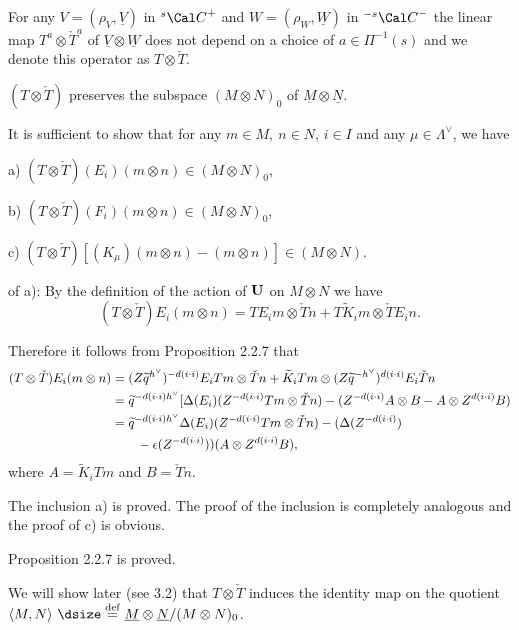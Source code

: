   For any  $V = (\rho_V, \underline{V})$ in ${}^s{\Cal C}^+$
and $W = (\rho_W, \underline{W})$  in  ${}^{-s}{\Cal C}^-$  the linear map
$T^a \otimes \check{T}^a$  of  $\underline{V} \otimes \underline{W}$  does not
depend on a choice of  $a \in \Pi^{-1}(s)$  and we denote this operator as
$T \otimes \check{T}$.


 $(T \otimes \check{T})$  preserves the subspace
$(M \otimes N)_0$ of $\underline{M} \otimes \underline{N}$.
\endproclaim

  It is sufficient to show that for any  $m \in M,\ n \in N$,
$i \in I$  and any  $\mu \in \Lambda^\vee$,  we have

\item{a)}  $(T \otimes \check{T})(E_i) (m \otimes n) \in (M \otimes N)_0$,

\item{b)}  $(T \otimes \check{T})(F_i)(m \otimes n) \in (M \otimes N)_0$,

\item{c)}  $(T \otimes \check{T})[(K_\mu)(m \otimes n) - (m \otimes n)] \in
(M \otimes N)$.
\enddemo

 of a):  By the definition of the action of ${\bold U}$  on
$M \otimes N$  we have
$$
(T \otimes \check{T}) E_i(m \otimes n) = TE_im \otimes \check{T}n +
T\widetilde{K}_im \otimes \check{T} E_in.
$$
\enddemo

Therefore it follows from Proposition 2.2.7 that
$$
\aligned
(T \otimes \check{T}) E_i (m \otimes n)
&= (Z\widetilde{q}^{h^\vee})^{-d(i\cdot i)} E_i Tm \otimes \check{T}n
+ \widetilde{K}_i Tm \otimes (Z\widetilde{q}^{-h^\vee})^{d(i\cdot i)}
E_i \check{T}n  \\
&= \widetilde{q}^{-d(i\cdot i)h^\vee} [\Delta (E_i)(Z^{-d(i\cdot i)} Tm \otimes
\check{T}n) - (Z^{-d(i\cdot i)} A \otimes B - A \otimes Z^{d(i\cdot i)}B) \\
&= \widetilde{q}^{-d(i\cdot i)h^\vee} \Delta (E_i)(Z^{-d(i\cdot i)} Tm \otimes
\check{T}n) - (\Delta(Z^{-d(i\cdot i)}) \\
&\qquad  - \epsilon(Z^{-d(i\cdot i)})) (A \otimes Z^{d(i\cdot i)}B),
\endaligned
$$
where  $A = \widetilde{K}_iTm$  and  $B = \check{T}n$.

The inclusion a) is proved.  The proof of the inclusion is completely analogous
and the proof of c) is obvious.

Proposition 2.2.7 is proved.

   We will show later (see 3.2) that $T \otimes \check{T}$
induces
the identity map on the quotient  $\langle M,N\rangle\
{\dsize\buildrel{\text{def}}\over =}\ \underline{M}\otimes
\underline{N}/(M \otimes N)_0$.
\enddemo


